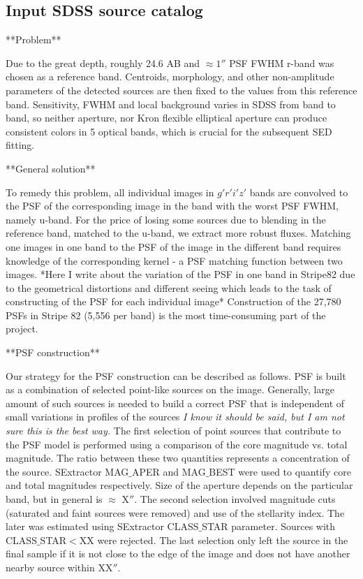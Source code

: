 \documentclass[numberedappendix,apj,twocolumn]{emulateapj}
\begin{document}
\subsection{Input SDSS source catalog} 
**Problem**

Due to the great depth, roughly 24.6 AB and $\approx1''$ PSF FWHM r-band was chosen as a reference band. Centroids, morphology, and other non-amplitude parameters of the detected sources are then fixed to the values from this reference band. Sensitivity, FWHM and local background varies in SDSS from band to band, so neither aperture, nor Kron flexible elliptical aperture \citep{Kron1980} can produce consistent colors in 5 optical bands, which is crucial for the subsequent SED fitting.

**General solution**

To remedy this problem, all individual images in $g'r'i'z'$ bands are convolved to the PSF of the corresponding image in the band with the worst PSF FWHM, namely u-band. For the price of losing some sources due to blending in the reference band, matched to the u-band, we extract more robust fluxes.
Matching one images in one band to the PSF of the image in the different band requires knowledge of the corresponding kernel - a PSF matching function between two images. 
*Here I write about the variation of the PSF in one band in Stripe82 due to the geometrical distortions and different seeing which leads to the task of constructing of the PSF for each individual image*
Construction of the 27,780 PSFs in Stripe 82 (5,556 per band) is the most time-consuming part of the project.

**PSF construction**

Our strategy for the PSF construction can be described as follows. PSF is built as a combination of selected point-like sources on the image. Generally, large amount of such sources is needed to build a correct PSF that is independent of small variations in profiles of the sources \textit{I know it should be said, but I am not sure this is the best way.} The first selection of point sources that contribute to the PSF model is performed using a comparison of the core magnitude vs. total magnitude. The ratio between these two quantities represents a concentration of the source. SExtractor MAG$\_$APER and MAG$\_$BEST were used to quantify core and total magnitudes respectively. Size of the aperture depends on the particular band, but in general is $\approx$ X$''$.
The second selection involved magnitude cuts (saturated and faint sources were removed) and use of the stellarity index. The later was estimated using SExtractor CLASS$\_$STAR parameter. Sources with CLASS$\_$STAR$<$XX were rejected. The last selection only left the source in the final sample if it is not close to the edge of the image and does not have another nearby source within XX$''$. 
\end{document}

